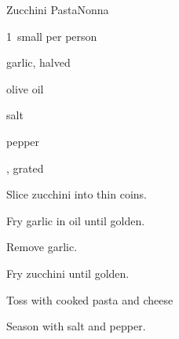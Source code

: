 \begin{recipe}{Zucchini Pasta}{Nonna}{}

\begin{ingredients}
\item 1~small  per person
\item garlic, halved
\item olive oil
\item salt
\item pepper
\item {}, grated
\end{ingredients}

\begin{directions}
\item Slice zucchini into thin coins.
\item Fry garlic in oil until golden.
\item Remove garlic.
\item Fry zucchini until golden.
\item Toss with cooked pasta and cheese
\item Season with salt and pepper.
\end{directions}

\end{recipe}
